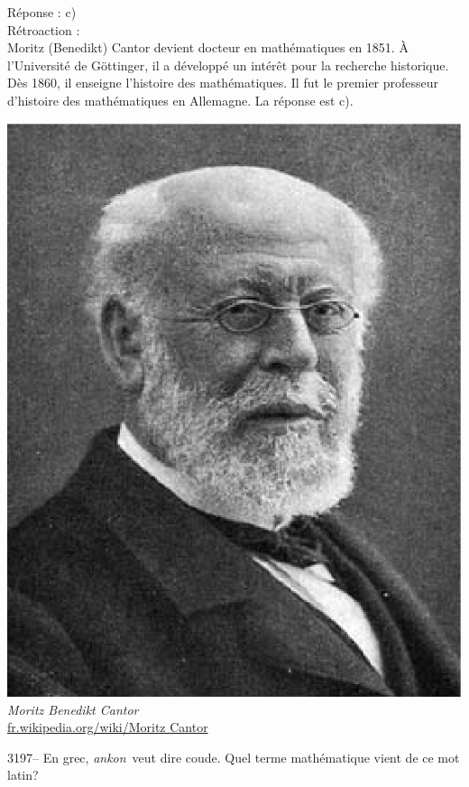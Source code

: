 \documentclass[letterpaper, 12pt]{article}
\begin{document}
R\'eponse : c)\\

R\'etroaction :\\
Moritz (Benedikt) Cantor devient docteur en math\'ematiques en 1851. \`A l'Universit\'e de G\"ottinger, il a d\'evelopp\'e un int\'er\^et pour la recherche historique. D\`es 1860, il enseigne l'histoire des math\'ematiques. Il fut le premier professeur d'histoire des math\'ematiques en Allemagne. La r\'eponse est c).\\
\begin{center}
\includegraphics[scale=0.35]{Moritz_Benedikt_Cantor.eps}\\
\emph{{\small Moritz Benedikt Cantor}}\\
\href{http://fr.wikipedia.org/wiki/Moritz_Cantor}{fr.wikipedia.org/wiki/Moritz Cantor}\\[5mm]
\end{center}



3197-- En grec, \og \emph{ankon}\fg \ veut dire \og coude\fg. Quel terme math\'ematique vient de ce mot latin?\\
\end{document}
